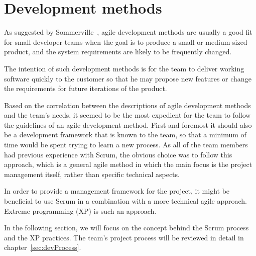 \section{Development methods}

As suggested by Sommerville~\cite{scrum}, agile development methods are usually a good fit for small developer teams when the goal is to produce a small or medium-sized product, and the system requirements are likely to be frequently changed.

The intention of such development methods is for the team to deliver working software quickly to the customer so that he may propose new features or change the requirements for future iterations of the product.

Based on the correlation between the descriptions of agile development methods and the team's needs, it seemed to be the most expedient for the team to follow the guidelines of an agile development method. First and foremost it should also be a development framework that is known to the team, so that a minimum of time would be spent trying to learn a new process. As all of the team members had previous experience with Scrum, the obvious choice was to follow this approach, which is a general agile method in which the main focus is the project management itself, rather than specific technical aspects.

In order to provide a management framework for the project, it might be beneficial to use Scrum in a combination with a more technical agile approach. Extreme programming (XP) is such an approach.

In the following section, we will focus on the concept behind the Scrum process and the XP practices. The team's project process will be reviewed in detail in chapter~\ref{sec:devProcess}.